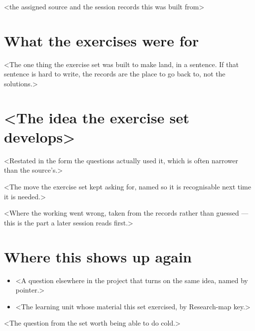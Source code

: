 \documentclass[a4paper,10pt]{article}
\begin{document}
%
  {<the assigned source and the session records this was built from>}

\section{What the exercises were for}
<The one thing the exercise set was built to make land, in a sentence. If that sentence is hard to write,
the records are the place to go back to, not the solutions.>

\section{<The idea the exercise set develops>}

\begin{defn}[<term>]
<Restated in the form the questions actually used it, which is often narrower than the source's.>
\end{defn}

\begin{remark}
<The move the exercise set kept asking for, named so it is recognisable next time it is needed.>
\end{remark}

\begin{warning}
<Where the working went wrong, taken from the records rather than guessed --- this is the part a
later session reads first.>
\end{warning}

\section{Where this shows up again}
\begin{itemize}
  \item <A question elsewhere in the project that turns on the same idea, named by pointer.>
  \item <The learning unit whose material this set exercised, by Research-map key.>
\end{itemize}

\begin{checkyourself}
  \item <The question from the set worth being able to do cold.>
\end{checkyourself}
\end{document}
